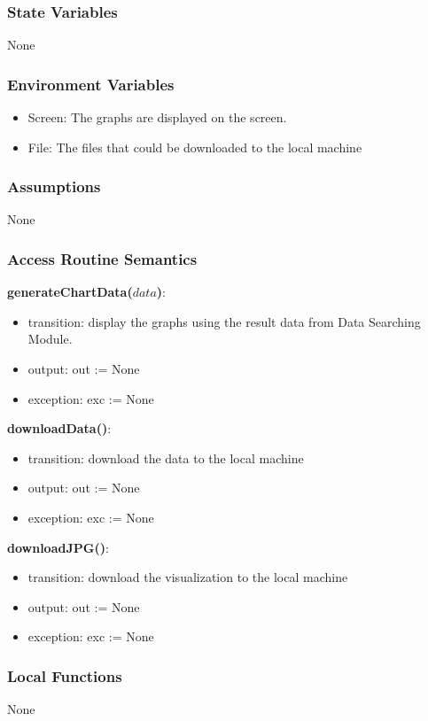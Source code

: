 \documentclass[12pt, titlepage]{article}
\begin{document}
\subsubsection{State Variables}
None

\subsubsection{Environment Variables}
\begin{itemize}
\item Screen: The graphs are displayed on the screen.
\item File: The files that could be downloaded to the local machine
\end{itemize}
\subsubsection{Assumptions}
None
\subsubsection{Access Routine Semantics}

\noindent \textbf{generateChartData($data$)}:
\begin{itemize}
\item transition: display the graphs using the result data from Data Searching Module.
\item output: out := None
\item exception: exc := None
\end{itemize}

\noindent \textbf{downloadData()}:
\begin{itemize}
\item transition: download the data to the local machine
\item output: out := None
\item exception: exc := None
\end{itemize}

\noindent \textbf{downloadJPG()}:
\begin{itemize}
\item transition: download the visualization to the local machine
\item output: out := None
\item exception: exc := None
\end{itemize}

\subsubsection{Local Functions}
None
\newpage
\end{document}
